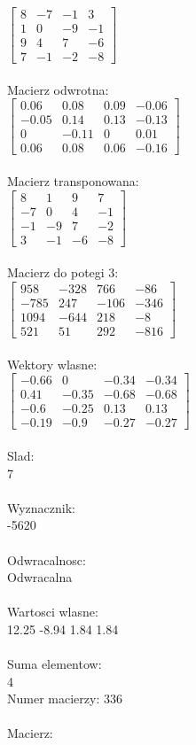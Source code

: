 \documentclass[a4paper,12pt]{article}
\begin{document}
$\begin{bmatrix} 8&-7&-1&3\\1&0&-9&-1\\9&4&7&-6\\7&-1&-2&-8 \end{bmatrix}$
\\
\\
Macierz odwrotna:\\

$\begin{bmatrix} 0.06&0.08&0.09&-0.06\\-0.05&0.14&0.13&-0.13\\0&-0.11&0&0.01\\0.06&0.08&0.06&-0.16 \end{bmatrix}$
\\
\\
Macierz transponowana:\\

$\begin{bmatrix} 8&1&9&7\\-7&0&4&-1\\-1&-9&7&-2\\3&-1&-6&-8 \end{bmatrix}$
\\
\\
Macierz do potegi 3:\\

$\begin{bmatrix} 958&-328&766&-86\\-785&247&-106&-346\\1094&-644&218&-8\\521&51&292&-816 \end{bmatrix}$
\\
\\
Wektory wlasne:\\

$\begin{bmatrix} -0.66&0&-0.34&-0.34\\0.41&-0.35&-0.68&-0.68\\-0.6&-0.25&0.13&0.13\\-0.19&-0.9&-0.27&-0.27 \end{bmatrix}$
\\
\\
Slad:\\
7
\\
\\
Wyznacznik:\\
-5620
\\
\\
Odwracalnosc:\\
Odwracalna
\\
\\
Wartosci wlasne:\\
12.25 -8.94 1.84 1.84
\\
\\
Suma elementow:\\
4
\\
\newpage
Numer macierzy:
336
\\
\\
Macierz:\\
\end{document}
